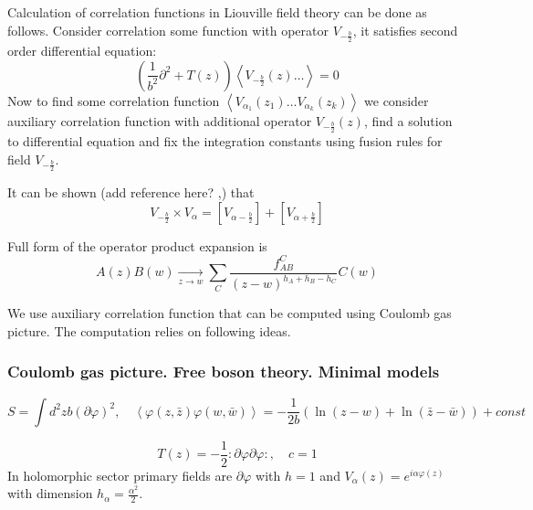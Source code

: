 \documentclass[12pt]{article}
\begin{document}
Calculation of correlation functions in Liouville field theory can be done as follows. 
Consider correlation some function with operator $V_{-\frac{b}{2}}$, it satisfies second order
differential equation:
\begin{equation}
  \label{eq:33}
  \left(\frac{1}{b^{2}}\partial^{2}+T(z)\right)\left<V_{-\frac{b}{2}}(z) \dots \right>=0
\end{equation}
Now to find some correlation function $\left<V_{\alpha_{1}}(z_{1})\dots
  V_{\alpha_{k}}(z_{k})\right>$ we consider auxiliary correlation function with additional
operator $V_{-\frac{b}{2}}(z)$, find a solution to differential equation and fix the integration
constants using fusion rules for field $V_{-\frac{b}{2}}$.

It can be shown (add reference here? \cite{nakayama2004liouville},\cite{teschner2001liouville}) that 
\begin{equation}
  \label{eq:34}
  V_{-\frac{b}{2}}\times V_{\alpha}= [V_{\alpha-\frac{b}{2}}]+[V_{\alpha+\frac{b}{2}}]
\end{equation}


Full form of the operator product expansion is
\begin{equation}
  \label{eq:39}
  A(z)B(w)\underset{z\to w}{\longrightarrow} \sum_{C} \frac{f_{AB}^{C}}{(z-w)^{h_{A}+h_{B}-h_{C}}} C(w)
\end{equation}

We use auxiliary correlation function that can be computed using Coulomb gas picture. The
computation relies on following ideas.


\subsubsection{Coulomb gas picture. Free boson theory. Minimal models}
\label{sec:free-boson-minimal-models}


\begin{equation}
  \label{eq:40}
  S=\int d^{2}z b (\partial \varphi)^{2},\quad \left<\varphi(z,\bar z)\varphi(w,\bar
    w)\right>=-\frac{1}{2b}\left(\ln (z-w) + \ln (\bar z - \bar w)\right)+const
\end{equation}

\begin{equation}
  \label{eq:42}
  T(z)=-\frac{1}{2}:\partial \varphi \partial \varphi:, \quad c=1
\end{equation}
In holomorphic sector primary fields are $\partial \varphi$ with $h=1$ and
$V_{\alpha}(z)=e^{i \alpha \varphi(z)}$ with dimension $h_{\alpha}=\frac{\alpha^{2}}{2}$.
\end{document}
